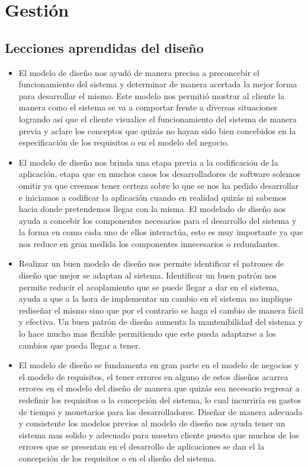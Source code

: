 \documentclass[12pt,oneside,letterpaper]{report}
\begin{document}
\section{Gestión}
\subsection{Lecciones aprendidas del diseño}

\begin{itemize}
 \item El modelo de diseño nos ayudó de manera precisa a preconcebir el funcionamiento del sistema y determinar de manera acertada la mejor forma para desarrollar el mismo. Este modelo nos permitió mostrar al cliente la manera como el sistema se va a comportar frente a diversas situaciones logrando así que el cliente visualice el funcionamiento del sistema de manera previa y aclare los conceptos que quizás no hayan sido bien concebidos en la especificación de los requisitos o en el modelo del negocio. 
 \item El modelo de diseño nos brinda una etapa previa a la codificación de la aplicación, etapa que en muchos casos los desarrolladores de software solemos omitir ya que creemos tener certeza sobre lo que se nos ha pedido desarrollar e iniciamos a codificar la aplicación cuando en realidad quizás ni sabemos hacia donde pretendemos llegar con la misma. El modelado de diseño nos ayuda a concebir los componentes necesarios para el desarrollo del sistema y la forma en como cada uno de ellos interactúa, esto es muy importante ya que nos reduce en gran medida los componentes innecesarios o redundantes.
 \item Realizar un buen modelo de diseño nos permite identificar el patrones de diseño que mejor se adaptan al sistema. Identificar un buen patrón  nos permite reducir el acoplamiento que se puede llegar a dar en el sistema, ayuda a que a la hora de implementar un cambio en el sistema no implique rediseñar el mismo sino que por el contrario se haga el cambio de manera fácil y efectiva. Un buen patrón de diseño aumenta la mantenibilidad del sistema y lo hace mucho mas flexible permitiendo que este pueda adaptarse a los cambios que pueda llegar a tener.
 \item El modelo de diseño se fundamenta en gran parte en el modelo de negocios y el modelo de requisitos, el tener errores en alguno de estos diseños acarrea errores en el modelo del diseño de manera que quizás sea necesario regresar a redefinir los requisitos o la concepción del sistema, lo cual incurriría en gastos de tiempo y monetarios para los desarrolladores. Diseñar de manera adecuada y consistente los modelos previos al modelo de diseño nos ayuda tener un sistema mas solido y adecuado para nuestro cliente puesto que muchos de los errores que se presentan en el desarrollo de aplicaciones se dan el la concepción de los requisitos o en el diseño del sistema.

\end{itemize}
\end{document}
